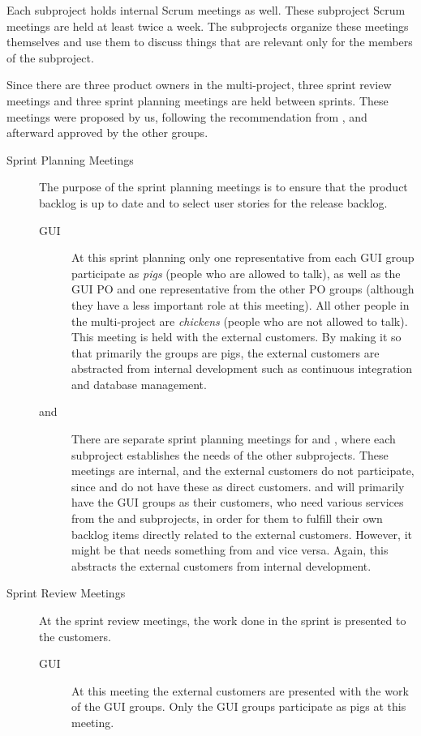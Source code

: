 Each subproject holds internal Scrum meetings as well. These subproject Scrum meetings are held at least twice a week. The subprojects organize these meetings themselves and use them to discuss things that are relevant only for the members of the subproject.

Since there are three product owners in the multi-project, three sprint review meetings and three sprint planning meetings are held between sprints. These meetings were proposed by us, following the recommendation from \textcite{bird_davies_2007}, and afterward approved by the other groups.

\begin{description}
  \item[Sprint Planning Meetings]
  The purpose of the sprint planning meetings is to ensure that the product backlog is up to date and to select user stories for the release backlog.
  \begin{description}
    \item[GUI] At this sprint planning only one representative from each GUI group participate as \emph{pigs} (people who are allowed to talk), as well as the GUI PO and one representative from the other PO groups (although they have a less important role at this meeting). All other people in the multi-project are \emph{chickens} (people who are not allowed to talk). This meeting is held with the external customers. By making it so that primarily the \gui groups are pigs, the external customers are abstracted from internal development such as continuous integration and database management.
    \item[\db and \bd] There are separate sprint planning meetings for \db and \bd, where each subproject establishes the needs of the other subprojects. These meetings are internal, and the external customers do not participate, since \db and \bd do not have these as direct customers. \db and \bd will primarily have the GUI groups as their customers, who need various services from the \db and \bd subprojects, in order for them to fulfill their own backlog items directly related to the external customers. However, it might be that \db needs something from \bd and vice versa. Again, this abstracts the external customers from internal development.
  \end{description}
  \item[Sprint Review Meetings]
  At the sprint review meetings, the work done in the sprint is presented to the customers.
  \begin{description}
    \item[GUI] At this meeting the external customers are presented with the work of the GUI groups. Only the GUI groups participate as pigs at this meeting.

\end{description}
\end{description}
